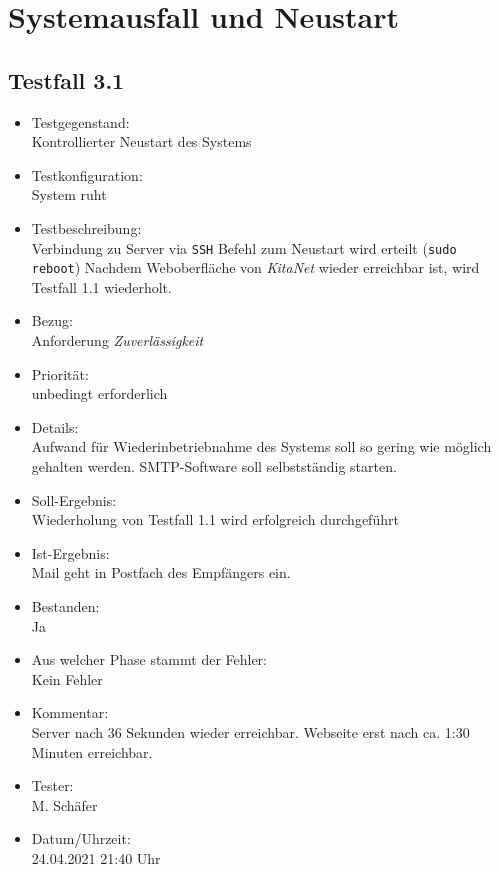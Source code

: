 \section{Systemausfall und Neustart}
\subsection{Testfall 3.1}
\begin{itemize}
	\item Testgegenstand:\\
Kontrollierter Neustart des Systems
	\item Testkonfiguration:\\
	System ruht
	\item Testbeschreibung:\\
	Verbindung zu Server via \verb+SSH+
	Befehl zum Neustart wird erteilt (\verb+sudo reboot+)
	Nachdem Weboberfläche von \textit{KitaNet} wieder erreichbar ist, wird Testfall 1.1 wiederholt.
	\item Bezug:\\
	Anforderung \textit{Zuverlässigkeit}
	\item Priorität:\\
	unbedingt erforderlich
	\item Details:\\
	Aufwand für Wiederinbetriebnahme des Systems soll so gering wie möglich gehalten werden. SMTP-Software soll selbstständig starten.
	\item Soll-Ergebnis:\\
	Wiederholung von Testfall 1.1 wird erfolgreich durchgeführt
	\item Ist-Ergebnis:\\
	Mail geht in Postfach des Empfängers ein.
	\item Bestanden:\\
	Ja
	\item Aus welcher Phase stammt der Fehler:\\
	Kein Fehler
	\item Kommentar:\\
	Server nach 36 Sekunden wieder erreichbar.
	Webseite erst nach ca. 1:30 Minuten erreichbar.
	\item Tester:\\
	M. Schäfer
	\item Datum/Uhrzeit:\\
	24.04.2021 21:40 Uhr
\end{itemize}

